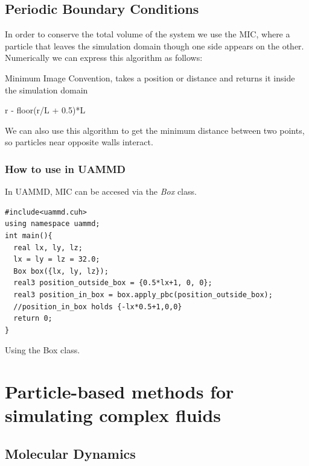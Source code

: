 \documentclass[ twoside,openright,titlepage,numbers=noenddot,%
headinclude,footinclude,cleardoublepage=empty,abstract=on,
BCOR=5mm,paper=a4,fontsize=11pt, dvipsnames
]{scrreprt}
\newcommand{\uammd}{\gls{UAMMD}\xspace}
\begin{document}
\section{Periodic Boundary Conditions}
In order to conserve the total volume of the system we use the \gls{MIC}, where a particle that leaves the simulation domain though one side appears on the other.
Numerically we can express this algorithm as follows:

\begin{algorithm}
  \caption{Minimum Image Convention, takes a position or distance and returns it inside the simulation domain}
  \begin{algorithmic}[1]
    \State \Return r - floor(r/L + 0.5)*L
    \EndFunction
  \end{algorithmic}
\end{algorithm}
We can also use this algorithm to get the minimum distance between two points, so particles near opposite walls interact.
\subsection{How to use in UAMMD}
In \uammd, \gls{MIC} can be accesed via the \emph{Box} class.
\begin{listing}[H]
\begin{verbatim}
#include<uammd.cuh>
using namespace uammd;
int main(){
  real lx, ly, lz;
  lx = ly = lz = 32.0;
  Box box({lx, ly, lz});
  real3 position_outside_box = {0.5*lx+1, 0, 0};
  real3 position_in_box = box.apply_pbc(position_outside_box);
  //position_in_box holds {-lx*0.5+1,0,0}
  return 0; 
}
\end{verbatim}
\caption{Using the Box class.}
\label{code:box}
\end{listing}


\chapter{Particle-based methods for simulating complex fluids}
\section{Molecular Dynamics}\label{sec:md}
\end{document}
